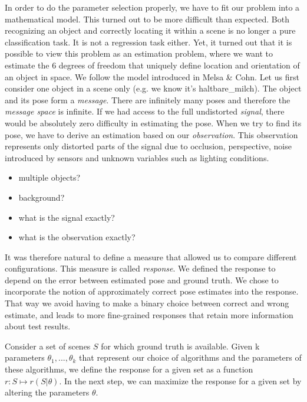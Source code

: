 In order to do the parameter selection properly, we have to fit our problem
into a mathematical model. This turned out to be more difficult than expected.
Both recognizing an object and correctly locating it within a scene is no
longer a pure classification task. It is not a regression task either. Yet, it
turned out that it is possible to view this problem as an estimation problem,
where we want to estimate the 6 degrees of freedom that uniquely define
location and orientation of an object in space. We follow the model introduced
in Melsa \& Cohn. Let us first consider one object in a scene only (e.g. we
know it's haltbare\_milch). The object and its pose form a {\it message}. There
are infinitely many poses and therefore the {\it message space} is infinite. If
we had access to the full undistorted {\it signal}, there would be absolutely
zero difficulty in estimating the pose.  When we try to find its pose, we have
to derive an estimation based on our {\it observation}. This observation
represents only distorted parts of the signal due to occlusion, perspective,
noise introduced by sensors and unknown variables such as lighting conditions.
\begin{itemize}
\item multiple objects?
\item background?
\item what is the signal exactly?
\item what is the observation exactly?
\end{itemize}
It was therefore natural to define a measure that allowed us to compare
different configurations. This measure is called {\it response}. We defined the
response to depend on the error between estimated pose and ground truth. We
chose to incorporate the notion of approximately correct pose estimates into
the response. That way we avoid having to make a binary choice between correct
and wrong estimate, and leads to more fine-grained responses that retain more
information about test results.

Consider a set of scenes $S$ for which ground truth is available. Given k
parameters $\theta_1, ..., \theta_k$ that represent our choice of algorithms
and the parameters of these algorithms, we define the response for a given set
as a function $r: S \mapsto r (S|\theta)$. In the next step, we can maximize
the response for a given set by altering the parameters $\theta$.





